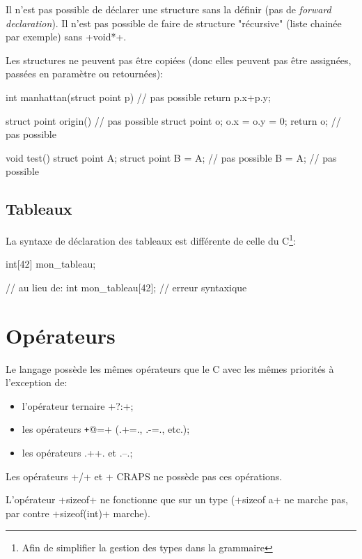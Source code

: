 \documentclass[a4paper]{article}
\begin{document}
      Il n'est pas possible de déclarer une structure sans la définir (pas de
      \emph{forward declaration}). Il n'est pas possible de faire de structure
      "récursive" (liste chainée par exemple) sans \imoc+void*+.

      Les structures ne peuvent pas être copiées (donc elles peuvent pas être
      assignées, passées en paramètre ou retournées):

      \begin{moc}
int manhattan(struct point p) { // pas possible
    return p.x+p.y;
}

struct point origin() { // pas possible
    struct point o;
    o.x = o.y = 0;
    return o; // pas possible
}

void test() {
    struct point A;
    struct point B = A; // pas possible
    B = A; // pas possible
}
      \end{moc}

    \subsection{Tableaux}
      La syntaxe de déclaration des tableaux est différente de celle du
      C\footnote{Afin de simplifier la gestion des types dans la grammaire}:
      \begin{moc}
int[42] mon_tableau;

// au lieu de:
int mon_tableau[42]; // erreur syntaxique
      \end{moc}

  \section{Opérateurs}
    Le langage possède les mêmes opérateurs que le C avec les mêmes priorités à
    l'exception de:
    \begin{itemize}
      \item l'opérateur ternaire \imoc+?:+;
      \item les opérateurs \texttt+@=+ (\imoc.+=., \imoc.-=., etc.);
      \item les opérateurs \imoc.++. et \imoc.--.;
    \end{itemize}

    Les opérateurs \imoc+/+ et \imoc+%
    CRAPS ne possède pas ces opérations.

    L'opérateur \imoc+sizeof+ ne fonctionne que sur un type (\imoc+sizeof a+ ne
    marche pas, par contre \imoc+sizeof(int)+ marche).
\end{document}
